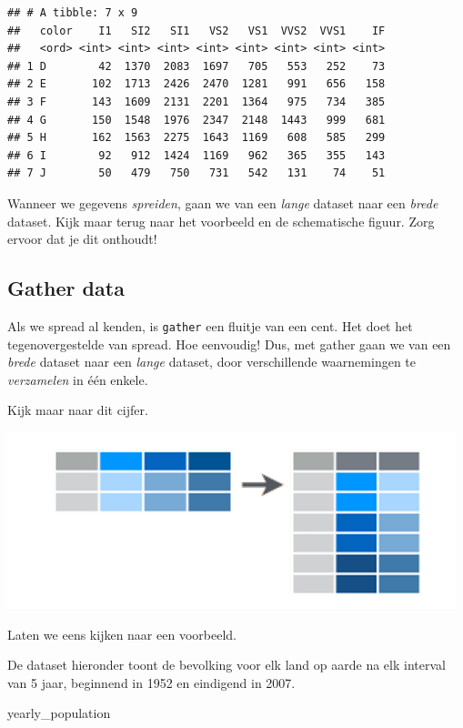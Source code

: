 \documentclass[]{tufte-book}
\newenvironment{Shaded}{}{}
\newcommand{\NormalTok}[1]{#1}
\begin{document}
\begin{verbatim}
## # A tibble: 7 x 9
##   color    I1   SI2   SI1   VS2   VS1  VVS2  VVS1    IF
##   <ord> <int> <int> <int> <int> <int> <int> <int> <int>
## 1 D        42  1370  2083  1697   705   553   252    73
## 2 E       102  1713  2426  2470  1281   991   656   158
## 3 F       143  1609  2131  2201  1364   975   734   385
## 4 G       150  1548  1976  2347  2148  1443   999   681
## 5 H       162  1563  2275  1643  1169   608   585   299
## 6 I        92   912  1424  1169   962   365   355   143
## 7 J        50   479   750   731   542   131    74    51
\end{verbatim}

Wanneer we gegevens \emph{spreiden}, gaan we van een \emph{lange} dataset naar een \emph{brede} dataset. Kijk maar terug naar het voorbeeld en de schematische figuur. Zorg ervoor dat je dit onthoudt!

\hypertarget{gather-data}{%
\subsection{Gather data}\label{gather-data}}

Als we spread al kenden, is \texttt{gather} een fluitje van een cent. Het doet het tegenovergestelde van spread. Hoe eenvoudig! Dus, met gather gaan we van een \emph{brede} dataset naar een \emph{lange} dataset, door verschillende waarnemingen te \emph{verzamelen} in één enkele.

Kijk maar naar dit cijfer.

\includegraphics[width=1\linewidth]{images/gather}

Laten we eens kijken naar een voorbeeld.

De dataset hieronder toont de bevolking voor elk land op aarde na elk interval van 5 jaar, beginnend in 1952 en eindigend in 2007.

\begin{Shaded}
\begin{Highlighting}[]
\NormalTok{yearly_population}
\end{Highlighting}
\end{Shaded}
\end{document}
